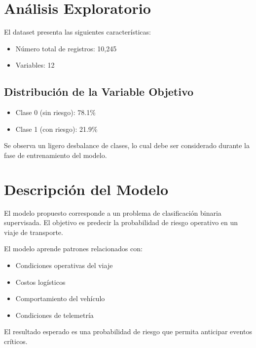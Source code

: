 \documentclass[12pt]{article}
\begin{document}
\section{Análisis Exploratorio}

El dataset presenta las siguientes características:

\begin{itemize}
    \item Número total de registros: 10,245
    \item Variables: 12
\end{itemize}

\subsection{Distribución de la Variable Objetivo}

\begin{itemize}
    \item Clase 0 (sin riesgo): 78.1\%
    \item Clase 1 (con riesgo): 21.9\%
\end{itemize}

Se observa un ligero desbalance de clases, lo cual debe ser considerado durante la fase de entrenamiento del modelo.

\section{Descripción del Modelo}

El modelo propuesto corresponde a un problema de clasificación binaria supervisada. El objetivo es predecir la probabilidad de riesgo operativo en un viaje de transporte.

El modelo aprende patrones relacionados con:

\begin{itemize}
    \item Condiciones operativas del viaje
    \item Costos logísticos
    \item Comportamiento del vehículo
    \item Condiciones de telemetría
\end{itemize}

El resultado esperado es una probabilidad de riesgo que permita anticipar eventos críticos.

\end{document}
